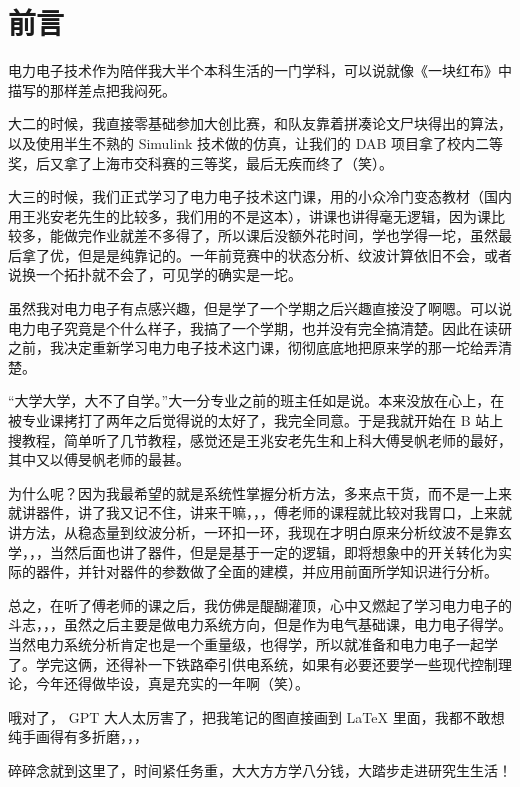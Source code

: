 
\begingroup
\hypersetup{pageanchor=false}
\pagestyle{empty}
\chapter*{前\qquad{}言}
\thispagestyle{empty}

电力电子技术作为陪伴我大半个本科生活的一门学科，可以说就像《一块红布》中描写的那样差点把我闷死。

大二的时候，我直接零基础参加大创比赛，和队友靠着拼凑论文尸块得出的算法，以及使用半生不熟的 Simulink 技术做的仿真，让我们的 DAB 项目拿了校内二等奖，后又拿了上海市交科赛的三等奖，最后无疾而终了（笑）。

大三的时候，我们正式学习了电力电子技术这门课，用的小众冷门变态教材（国内用王兆安老先生的比较多，我们用的不是这本），讲课也讲得毫无逻辑，因为课比较多，能做完作业就差不多得了，所以课后没额外花时间，学也学得一坨，虽然最后拿了优，但是是纯靠记的。一年前竞赛中的状态分析、纹波计算依旧不会，或者说换一个拓扑就不会了，可见学的确实是一坨。

虽然我对电力电子有点感兴趣，但是学了一个学期之后兴趣直接没了啊嗯。可以说电力电子究竟是个什么样子，我搞了一个学期，也并没有完全搞清楚。因此在读研之前，我决定重新学习电力电子技术这门课，彻彻底底地把原来学的那一坨给弄清楚。

“大学大学，大不了自学。”大一分专业之前的班主任如是说。本来没放在心上，在被专业课拷打了两年之后觉得说的太好了，我完全同意。于是我就开始在 B 站上搜教程，简单听了几节教程，感觉还是王兆安老先生和上科大傅旻帆老师的最好，其中又以傅旻帆老师的最甚。

为什么呢？因为我最希望的就是系统性掌握分析方法，多来点干货，而不是一上来就讲器件，讲了我又记不住，讲来干嘛，，，傅老师的课程就比较对我胃口，上来就讲方法，从稳态量到纹波分析，一环扣一环，我现在才明白原来分析纹波不是靠玄学，，，当然后面也讲了器件，但是是基于一定的逻辑，即将想象中的开关转化为实际的器件，并针对器件的参数做了全面的建模，并应用前面所学知识进行分析。

总之，在听了傅老师的课之后，我仿佛是醍醐灌顶，心中又燃起了学习电力电子的斗志，，，虽然之后主要是做电力系统方向，但是作为电气基础课，电力电子得学。当然电力系统分析肯定也是一个重量级，也得学，所以就准备和电力电子一起学了。学完这俩，还得补一下铁路牵引供电系统，如果有必要还要学一些现代控制理论，今年还得做毕设，真是充实的一年啊（笑）。

哦对了， GPT 大人太厉害了，把我笔记的图直接画到 \LaTeX{} 里面，我都不敢想纯手画得有多折磨，，，

碎碎念就到这里了，时间紧任务重，大大方方学八分钱，大踏步走进研究生生活！

\clearpage
\endgroup
